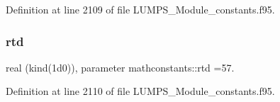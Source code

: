 Definition at line 2109 of file L\+U\+M\+P\+S\+\_\+\+Module\+\_\+constants.\+f95.

\mbox{\label{namespacemathconstants_a9e7d0779306b0fa5ccd63d7c7fea37c0}} 
\subsubsection{\texorpdfstring{rtd}{rtd}}
{\footnotesize\ttfamily real (kind(1d0)), parameter mathconstants\+::rtd =57.}



Definition at line 2110 of file L\+U\+M\+P\+S\+\_\+\+Module\+\_\+constants.\+f95.

